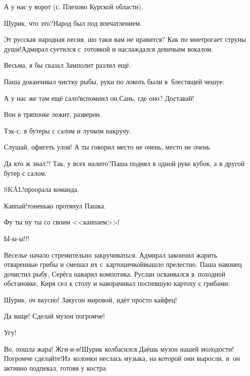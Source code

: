 {\raggedleft \scriptsize \mdash А у нас у ворот (с. Плехово Курской области). \par}

\vspace{0.5cm}

\diagdash Шурик, что это?\mdash Народ был под впечатлением.

\diagdash Эт русская народная песня, шо таки вам не нравится? Как по мне\mdash трогает струны души!\mdash Адмирал суетился с~готовкой и наслаждался девичьим вокалом.

\diagdash Весьма, я бы сказал\myldots{} \mdash Замполит разлил ещё.

Паша доканчивал чистку рыбы, руки по локоть были в~блестящей чешуе:

\diagdash А у нас же там ещё сало!\mdash вспомнил он.\mdash Сань, где оно? Доставай!

\diagdash Вон в тряпочке лежит, разверни.

\diagdash Тэк-с, я бутеры с салом и лучком накручу.

\diagdash Слушай, офигеть улов! А ты говорил место не очень, место не очень\myldots{}

\diagdash Да кто ж знал?! Так, у всех налито?\mdash Паша поднял в одной руке кубок, а в другой бутер с салом.

\diagdash SKÅL!\mdash проорала команда.

\diagdash Канпай!\mdash тоненько протянул Пашка.

\diagdash Фу ты ну ты со своим <<канпаем>>!

\diagdash Ы-ы-ы!!!

Веселье начало стремительно закручиваться. Адмирал закончил жарить отваренные грибы и смешал их с~картошечкой\mdash вышло прелестно. Паша наконец дочистил рыбу, Серёга наварил компотика. Руслан осваивался в~походной обстановке, Киря сел к столу и наворачивал поспевшую картоху с грибами:

\diagdash Шурик, оч вкусно! Закусон мировой, идёт просто кайфец!

\diagdash Да ваще! Сделай музон погромче!

\diagdash Угу!

\diagdash Во, пошла жара! Жги-и-и!\mdash Шурик колбасился.\mdash Даёшь музон нашей молодости! Погромче сделайте!\mdash Из~колонки неслась музыка, на которой они выросли, и~он активно подпевал, готовя у костра.

%
%

